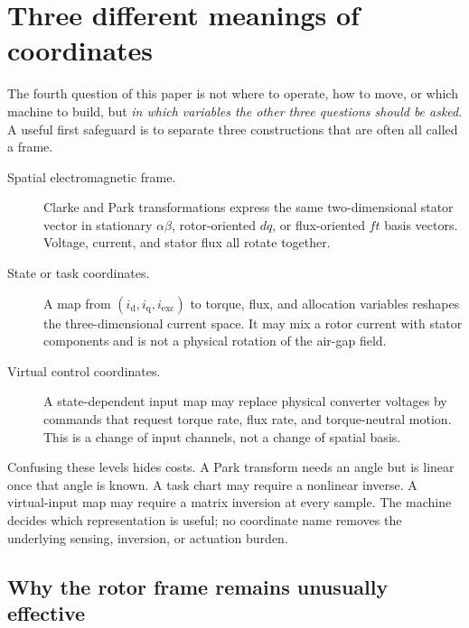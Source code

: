 \section{Three different meanings of coordinates}
\label{sec:coordinate-layers}

The fourth question of this paper is not where to operate, how to move, or
which machine to build, but \emph{in which variables the other three questions
should be asked}. A useful first safeguard is to separate three constructions
that are often all called a frame.

\begin{description}
 \item[Spatial electromagnetic frame.] Clarke and Park transformations express
 the same two-dimensional stator vector in stationary \(\alpha\beta\),
 rotor-oriented \(dq\), or flux-oriented \(ft\) basis vectors. Voltage,
 current, and stator flux all rotate together.
 \item[State or task coordinates.] A map from
 \((i_{\mathrm d},i_{\mathrm q},i_{\mathrm{exc}})\) to torque, flux, and
 allocation variables reshapes the three-dimensional current space. It may
 mix a rotor current with stator components and is not a physical rotation of
 the air-gap field.
 \item[Virtual control coordinates.] A state-dependent input map may replace
 physical converter voltages by commands that request torque rate, flux rate,
 and torque-neutral motion. This is a change of input channels, not a change
 of spatial basis.
\end{description}



Confusing these levels hides costs. A Park transform needs an angle but is
linear once that angle is known. A task chart may require a nonlinear inverse.
A virtual-input map may require a matrix inversion at every sample. The
machine decides which representation is useful; no coordinate name removes
the underlying sensing, inversion, or actuation burden.

\subsection{Why the rotor frame remains unusually effective}

